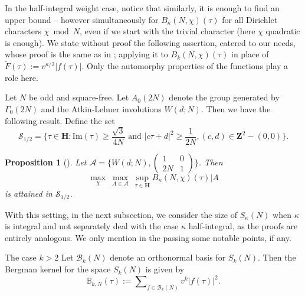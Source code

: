 \documentclass[11pt]{amsart}
\makeatletter
\numberwithin{equation}{section}
\renewcommand\subsubsection{\@secnumfont}{\bfseries}%
\renewcommand\subsubsection{\@startsection{subsubsection}{3}
  \z@{.5\linespacing\@plus.7\linespacing}{-.5em}%
  {\normalfont\bfseries}}
\theoremstyle{plain}
\newtheorem{prop}[thm]{Proposition}
\theoremstyle{definition}
\newcommand{\h}{\mf H}
\newcommand{\mbb}{\mathbb}
\newcommand{\mf}{\mathbf}
\newcommand{\mc}{\mathcal}
\newcommand{\mrm}{\mathrm}
\newcommand{\im}{\mrm{Im}}
\newcommand{\sumn}{\sum \nolimits}
\newcommand{\smat}[4]{\left( \begin{smallmatrix}#1&#2\\#3&#4\end{smallmatrix}\right)}
\makeatother
\begin{document}
In the half-integral weight case, notice that similarly, it is enough to find an upper bound -- however simultaneously for $B_{\kappa}(N, \chi)(\tau)$ for all Dirichlet characters $\chi \bmod N$, even if we start with the trivial character (here $\chi$ quadratic is enough). We state without proof the following assertion, catered to our needs, whose proof is the same as in \cite{Kir}; applying it to $\displaystyle B_k(N,\chi)(\tau)$ in place of $\tilde F(\tau):= v^{\kappa/2} |f(\tau)|$. Only the automorphy properties of the functions play a role here.

 Let $N$ be odd and square-free. Let $A_0(2N)$ denote the group generated by $\Gamma_0(2N)$ and the Atkin-Lehner involutions $W(d;N)$. Then we have the following result. Define the set
 \begin{equation}
   \mc S_{1/2}=\{ \tau \in\h :  \im ( \tau)\ge \frac{\sqrt{3}}{4N} \text{ and } |c \tau+d |^2 \ge \frac{1}{2N} , (c,d)\in \mf Z^2-(0,0)\}.
\end{equation}

\begin{prop}[\cite{Kir}] 
   Let $\mc A=\{W(d;N), \smat{1}{0}{2N}{1}\}$. Then \[\max_\chi~ \max_{A\in \mc A} ~\sup_{\tau\in \mf H}B_{\kappa}(N, \chi)(\tau)|A\] is attained in $\mc S_{1/2}$.
\end{prop}
With this setting, in the next subsection, we consider the size of $S_\kappa(N)$ when $\kappa$ is integral and not separately deal with the case $\kappa$ half-integral, as the proofs are entirely analogous. We only mention in the passing some notable points, if any.

\subsubsection{The case $k>2$} Let $\mc B_{k}(N)$ denote an orthonormal basis for $S_k(N)$. Then the Bergman kernel for the space $S_k(N)$ is given by
\begin{equation}\label{BKn=1}
    \mbb B_{k,N}(\tau):= \sumn_{f\in \mc B_{k}(N)}v^k |f(\tau)|^2.
\end{equation}
\end{document}
